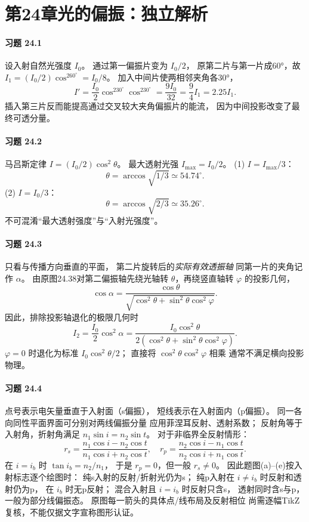 \section*{第24章\quad 光的偏振：独立解析}
\paragraph{习题 24.1}
设入射自然光强度 \(I_0\)。
通过第一偏振片变为 \(I_0/2\)，
原第二片与第一片成60°，故
\(I_1=(I_0/2)\cos^260^\circ=I_0/8\)。
加入中间片使两相邻夹角各30°，
\[
I'=\frac{I_0}{2}\cos^230^\circ\cos^230^\circ
=\frac{9I_0}{32}
=\boxed{\frac94I_1=2.25I_1}.
\]
插入第三片反而能提高通过交叉较大夹角偏振片的能流，
因为中间投影改变了最终可透分量。

\paragraph{习题 24.2}
马吕斯定律 \(I=(I_0/2)\cos^2\theta\)。
最大透射光强 \(I_{\max}=I_0/2\)。
(1) \(I=I_{\max}/3\)：
\[
\boxed{\theta=\arccos\sqrt{1/3}\simeq54.74^\circ}.
\]
(2) \(I=I_0/3\)：
\[
\boxed{\theta=\arccos\sqrt{2/3}\simeq35.26^\circ}.
\]
不可混淆“最大透射强度”与“入射光强度”。

\paragraph{习题 24.3}
只看与传播方向垂直的平面，
第二片旋转后的\emph{实际有效透振轴}
同第一片的夹角记作 \(\alpha\)。
由原图24.38对第二偏振轴先绕光轴转
\(\theta\)，再绕竖直轴转 \(\varphi\) 的投影几何，
\[
\cos\alpha=
\frac{\cos\theta}
{\sqrt{\cos^2\theta+\sin^2\theta\cos^2\varphi}}.
\]
因此，排除投影轴退化的极限几何时
\[
\boxed{I_2=\frac{I_0}{2}\cos^2\alpha
=\frac{I_0\cos^2\theta}
{2(\cos^2\theta+\sin^2\theta\cos^2\varphi)}}.
\]
\(\varphi=0\) 时退化为标准 \(I_0\cos^2\theta/2\)；
直接将 \(\cos^2\theta\cos^2\varphi\) 相乘
通常不满足横向投影物理。

\paragraph{习题 24.4}
点号表示电矢量垂直于入射面（s偏振），
短线表示在入射面内（p偏振）。
同一各向同性平面界面可分别对两线偏振分量
应用菲涅耳反射、透射系数；
反射角等于入射角，折射角满足
\(n_1\sin i=n_2\sin t\)。
对于非临界全反射情形：
\[
r_s=\frac{n_1\cos i-n_2\cos t}
{n_1\cos i+n_2\cos t},\quad
r_p=\frac{n_2\cos i-n_1\cos t}
{n_2\cos i+n_1\cos t}.
\]
在 \(i=i_b\) 时 \(\tan i_b=n_2/n_1\)，
于是 \(\boxed{r_p=0}\)，但一般 \(r_s\ne0\)。
因此题图(a)--(e)按入射标志逐个绘图时：
纯s入射的反射/折射光仍为s；
纯p入射在 \(i\ne i_b\) 时反射和透射仍为p，
在 \(i_b\) 时无p反射；
混合入射且 \(i=i_b\) 时反射只含s，
透射同时含s与p，一般为部分线偏振态。
原图每一箭头的具体点/线布局及反射相位
尚需逐幅TikZ复核，不能仅据文字宣称图形认证。

